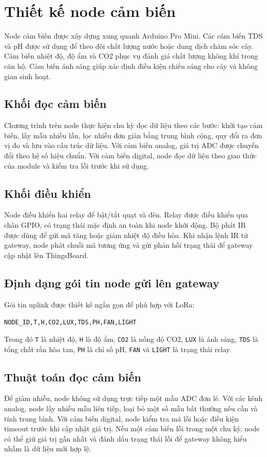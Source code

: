 \section{Thiết kế node cảm biến}
Node cảm biến được xây dựng xung quanh Arduino Pro Mini. Các cảm biến TDS và pH được sử dụng để theo dõi chất lượng nước hoặc dung dịch chăm sóc cây. Cảm biến nhiệt độ, độ ẩm và CO2 phục vụ đánh giá chất lượng không khí trong căn hộ. Cảm biến ánh sáng giúp xác định điều kiện chiếu sáng cho cây và không gian sinh hoạt.

\subsection{Khối đọc cảm biến}
Chương trình trên node thực hiện chu kỳ đọc dữ liệu theo các bước: khởi tạo cảm biến, lấy mẫu nhiều lần, lọc nhiễu đơn giản bằng trung bình cộng, quy đổi ra đơn vị đo và lưu vào cấu trúc dữ liệu. Với cảm biến analog, giá trị ADC được chuyển đổi theo hệ số hiệu chuẩn. Với cảm biến digital, node đọc dữ liệu theo giao thức của module và kiểm tra lỗi trước khi sử dụng.

\subsection{Khối điều khiển}
Node điều khiển hai relay để bật/tắt quạt và đèn. Relay được điều khiển qua chân GPIO, có trạng thái mặc định an toàn khi node khởi động. Bộ phát IR được dùng để gửi mã tăng hoặc giảm nhiệt độ điều hòa. Khi nhận lệnh IR từ gateway, node phát chuỗi mã tương ứng và gửi phản hồi trạng thái để gateway cập nhật lên ThingsBoard.

\subsection{Định dạng gói tin node gửi lên gateway}
Gói tin uplink được thiết kế ngắn gọn để phù hợp với LoRa:
\begin{center}
\texttt{NODE\_ID,T,H,CO2,LUX,TDS,PH,FAN,LIGHT}
\end{center}
Trong đó \texttt{T} là nhiệt độ, \texttt{H} là độ ẩm, \texttt{CO2} là nồng độ CO2, \texttt{LUX} là ánh sáng, \texttt{TDS} là tổng chất rắn hòa tan, \texttt{PH} là chỉ số pH, \texttt{FAN} và \texttt{LIGHT} là trạng thái relay.

\subsection{Thuật toán đọc cảm biến}
Để giảm nhiễu, node không sử dụng trực tiếp một mẫu ADC đơn lẻ. Với các kênh analog, node lấy nhiều mẫu liên tiếp, loại bỏ một số mẫu bất thường nếu cần và tính trung bình. Với cảm biến digital, node kiểm tra mã lỗi hoặc điều kiện timeout trước khi cập nhật giá trị. Nếu một cảm biến lỗi trong một chu kỳ, node có thể giữ giá trị gần nhất và đánh dấu trạng thái lỗi để gateway không hiểu nhầm là dữ liệu mới hợp lệ.

